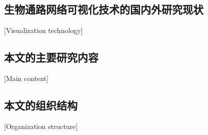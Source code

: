\subsection{生物通路网络可视化技术的国内外研究现状}[Visualization technology]
\subsection{本文的主要研究内容}[Main content]
\subsection{本文的组织结构}[Organization structure]



